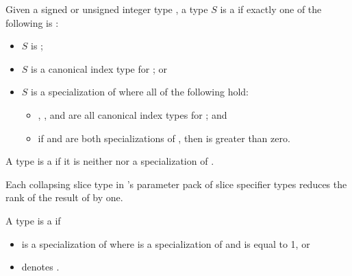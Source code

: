 \pnum
Given a signed or unsigned integer type ,
a type $S$ is a
if exactly one of the following is :
\begin{itemize}
\item
  $S$ is ;
\item
  $S$ is a canonical  index type for ; or
\item
  $S$ is a specialization of 
  where all of the following hold:
  \begin{itemize}
  \item
    , , and 
    are all canonical  index types for ; and
  \item
    if  and 
    are both specializations of ,
    then  is greater than zero.
  \end{itemize}
\end{itemize}

\pnum
A type  is a  if
it is neither  nor
a specialization of .
\begin{note}
Each collapsing slice type in 's parameter pack
of slice specifier types
reduces the rank of the result of  by one.
\end{note}

\pnum
A type  is a  if
\begin{itemize}
\item
   is a specialization of 
  where  is a specialization of  and
   is equal to 1, or
\item
   denotes .
\end{itemize}

